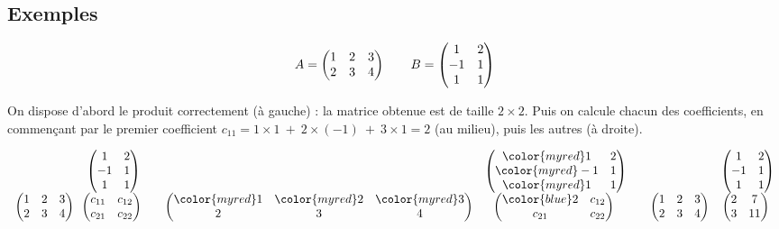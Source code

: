 \documentclass[class=report,crop=false]{standalone}
\begin{document}
\subsection{Exemples}

\begin{exemple}
$$A =\begin{pmatrix}
1 & 2 & 3\cr
2 & 3 & 4\cr
\end{pmatrix}\qquad B =
\begin{pmatrix}
1&2\cr
-1&1 \cr
1&1\cr
\end{pmatrix}
$$


On dispose d'abord le produit correctement (à gauche) : la matrice obtenue
est de taille $2\times2$.
Puis on calcule chacun des coefficients,
en commençant par le premier coefficient $c_{11} = 1\times 1\ +\ 2\times(-1)\ +\ 3\times1=2$ (au milieu),
puis les autres (à droite).

$$\begin{array}{cc}
  &  \begin{pmatrix}
1&2\cr
-1&1 \cr
1&1\cr
\end{pmatrix} \\
\begin{pmatrix}
1 & 2 & 3\cr
2 & 3& 4\cr
\end{pmatrix}
   &\!\!
 \begin{pmatrix} c_{11} & c_{12} \\ c_{21} & c_{22} \end{pmatrix}
  \end{array}
   \quad
 \begin{array}{cc}
  & \begin{pmatrix}
{\color{myred}1}&2\cr
{\color{myred}-1}&1 \cr
{\color{myred}1}&1\cr
\end{pmatrix}  \\
\begin{pmatrix}
{\color{myred}1} & {\color{myred}2} & {\color{myred}3}\cr
2 & 3& 4\cr
\end{pmatrix}
   &\!\! \begin{pmatrix} {\color{blue}2} & c_{12} \\ c_{21} & c_{22} \end{pmatrix}
  \end{array}
  \quad
 \begin{array}{cc}
  &
\begin{pmatrix}
1&2\cr
-1&1 \cr
1&1\cr
\end{pmatrix}\\
\begin{pmatrix}
1 & 2 & 3\cr
2 & 3& 4\cr
\end{pmatrix}
   &\!\! \begin{pmatrix} 2 & 7 \cr 3 & 11 \end{pmatrix}
  \end{array}
 $$


\end{exemple}
\end{document}
